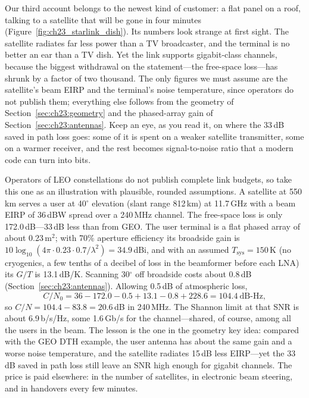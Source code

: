 


Our third account belongs to the newest kind of customer: a flat panel on a roof, talking to a
satellite that will be gone in four minutes (Figure~\ref{fig:ch23_starlink_dish}). Its
numbers look strange at first sight. The satellite radiates far less power than a TV broadcaster,
and the terminal is no better an ear than a TV dish. Yet the link supports gigabit-class
channels, because the biggest withdrawal on the statement---the free-space loss---has shrunk by a
factor of two thousand. The only figures we must assume are the satellite's beam EIRP and the
terminal's noise temperature, since operators do not publish them; everything else follows from
the geometry of Section~\ref{sec:ch23:geometry} and the phased-array gain of
Section~\ref{sec:ch23:antennas}. Keep an eye, as you read it, on where the 33\,dB saved in path
loss goes: some of it is spent on a weaker satellite transmitter, some on a warmer receiver, and
the rest becomes signal-to-noise ratio that a modern code can turn into bits.

\begin{worked}
Operators of LEO constellations do not publish complete link budgets, so take this one as an
illustration with plausible, rounded assumptions. A satellite at 550\,km serves a user at
40$^\circ$ elevation (slant range 812\,km) at 11.7\,GHz with a beam EIRP of 36\,dBW spread over a
240\,MHz channel. The free-space loss is only 172.0\,dB---33\,dB less than from GEO. The user
terminal is a flat phased array of about 0.23\,m$^2$; with 70\% aperture efficiency its broadside
gain is $10\log_{10}(4\pi\cdot0.23\cdot0.7/\lambda^2)=34.9$\,dBi, and with an assumed
$T_{\text{sys}}=150$\,K (no cryogenics, a few tenths of a decibel of loss in the beamformer
before each LNA) its $G/T$ is 13.1\,dB/K. Scanning 30$^\circ$ off broadside costs about 0.8\,dB
(Section~\ref{sec:ch23:antennas}). Allowing 0.5\,dB of atmospheric loss,
\[
C/N_0=36-172.0-0.5+13.1-0.8+228.6=104.4\ \text{dB-Hz},
\]
so $C/N=104.4-83.8=20.6$\,dB in 240\,MHz. The Shannon limit at that SNR is about 6.9\,b/s/Hz,
some 1.6\,Gb/s for the channel---shared, of course, among all the users in the beam. The lesson
is the one in the geometry key idea: compared with the GEO DTH example, the user antenna has
about the same gain and a worse noise temperature, and the satellite radiates 15\,dB less
EIRP---yet the 33\,dB saved in path loss still leave an SNR high enough for gigabit channels.
The price is paid elsewhere: in the number of satellites, in electronic beam steering, and in
handovers every few minutes.
\end{worked}

